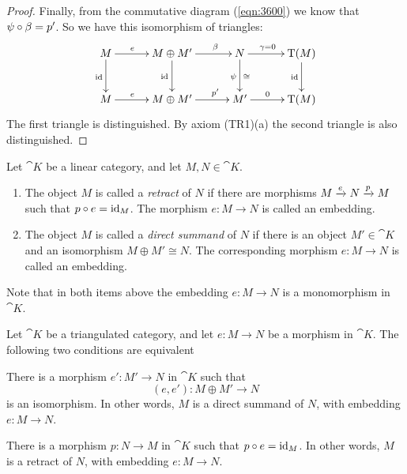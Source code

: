 \begin{proof}
Finally, from the commutative diagram (\ref{eqn:3600}) we know that 
$\psi \circ \beta = p'$. So we have this isomorphism of triangles: 
\begin{equation} \label{eqn:3605}
\UseTips  \xymatrix @C=7ex @R=6ex { 
M 
\ar[r]^(0.4){e}
\ar[d]_{\opn{id}}
&
M \oplus M'
\ar[r]^(0.64){\be}
\ar[d]_{\opn{id}_{}}
& 
N 
\ar[r]^(0.45){\ga = 0}
\ar[d]_{\psi}^{\cong}
&
\opn{T}(M)
\ar[d]_{\opn{id}}
\\
M
\ar[r]^(0.4){e}
&
M \oplus M'
\ar[r]^(0.64){p'}
&
M'
\ar[r]^(0.45){0}
& 
\opn{T}(M)
} 
\end{equation}
The first triangle is distinguished. By axiom (TR1)(a) the second triangle is 
also distinguished. 
\end{proof}

\begin{dfn} \label{dfn:3235}
Let $\cat{K}$ be a linear category, and let $M, N \in \cat{K}$.
\begin{enumerate}
\item The object $M$ is called a {\em retract}
of $N$ if there are morphisms 
$M \xrightarrow{e} N \xrightarrow{p} M$ such that $p \circ e = \operatorname{id}_M$. 
The morphism $e : M \to N$ is called an embedding. 

\item The object $M$ is called a {\em direct summand}
of $N$ if there is an 
object $M' \in \cat{K}$ and an isomorphism $M \oplus M' \cong N$. 
The corresponding morphism $e : M \to N$ is called an embedding. 
\end{enumerate}
\end{dfn}

Note that in both items above the embedding $e : M \to N$ is a monomorphism 
in $\cat{K}$. 

\begin{thm} \label{thm:4160}  
Let $\cat{K}$ be a triangulated category, and let $e : M \to N$
be a morphism in $\cat{K}$. 
The following two conditions are equivalent\tup{:}
\begin{enumerate}
 There is a morphism $e' : M' \to N$ in $\cat{K}$ such that 
\[ (e, e') : M \oplus M' \to N \]
is an isomorphism. In other words, $M$ is a direct summand of $N$,
with embedding $e : M \to N$. 

 There is a morphism $p : N \to M$  in $\cat{K}$  such that 
$p \circ e = \operatorname{id}_M$. In other words, $M$ is a retract of $N$, 
with embedding $e : M \to N$. 
\end{enumerate}
\end{thm}

